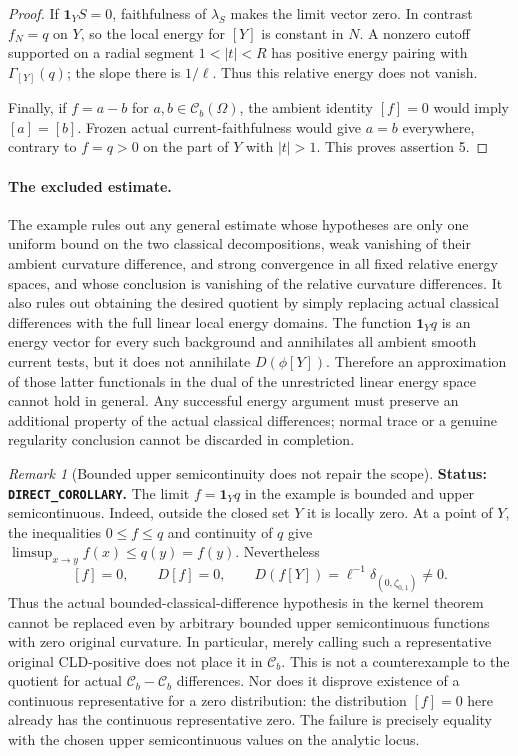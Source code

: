\documentclass[11pt,a4paper]{article}
\numberwithin{equation}{section}
\theoremstyle{definition}
\theoremstyle{remark}
\newtheorem{remark}[theorem]{Remark}
\begin{document}
\begin{proof}
If $\mathbf1_YS=0$, faithfulness of $\lambda_S$ makes the
limit vector zero. In contrast $f_N=q$ on $Y$, so the local
energy for $[Y]$ is constant in $N$. A nonzero cutoff supported
on a radial segment $1<|t|<R$ has positive energy pairing with
$\Gamma_{[Y]}(q)$; the slope there is $1/\ell$. Thus this
relative energy does not vanish.

Finally, if $f=a-b$ for $a,b\in\mathcal C_b(\Omega)$, the
ambient identity $[f]=0$ would imply $[a]=[b]$. Frozen actual
current-faithfulness would give $a=b$ everywhere, contrary to
$f=q>0$ on the part of $Y$ with $|t|>1$. This proves assertion 5.
\end{proof}

\paragraph{The excluded estimate.}
The example rules out any general estimate whose hypotheses
are only one uniform bound on the two classical decompositions,
weak vanishing of their ambient curvature difference, and strong
convergence in all fixed relative energy spaces, and whose
conclusion is vanishing of the relative curvature differences.
It also rules out obtaining the desired quotient by simply
replacing actual classical differences with the full linear
local energy domains. The function $\mathbf1_Yq$ is an energy
vector for every such background and annihilates all ambient
smooth current tests, but it does not annihilate
$D(\phi[Y])$. Therefore an approximation of those latter
functionals in the dual of the unrestricted linear energy
space cannot hold in general. Any successful energy argument
must preserve an additional property of the actual classical
differences; normal trace or a genuine regularity conclusion
cannot be discarded in completion.

\begin{remark}[Bounded upper semicontinuity does not repair the scope]
\label{rem:r5-bounded-usc-kernel-obstruction}
\textbf{Status: \texttt{DIRECT\_COROLLARY}.}
The limit $f=\mathbf1_Yq$ in the example is bounded and upper
semicontinuous. Indeed, outside the closed set $Y$ it is locally
zero. At a point of $Y$, the inequalities $0\leq f\leq q$ and
continuity of $q$ give
$\limsup_{x\to y}f(x)\leq q(y)=f(y)$.
Nevertheless
\[
                    [f]=0,\qquad D[f]=0,
             \qquad D(f[Y])=\ell^{-1}\delta_{(0,\zeta_{0,1})}
                                  \ne0.
\]
Thus the actual bounded-classical-difference hypothesis in the
kernel theorem cannot be replaced even by arbitrary bounded upper
semicontinuous functions with zero original curvature. In
particular, merely calling such a representative original
CLD-positive does not place it in $\mathcal C_b$.
This is not a counterexample to the quotient for actual
$\mathcal C_b-\mathcal C_b$ differences. Nor does it disprove
existence of a continuous representative for a zero distribution:
the distribution $[f]=0$ here already has the continuous
representative zero. The failure is precisely equality with the
chosen upper semicontinuous values on the analytic locus.
\end{remark}
\end{document}
